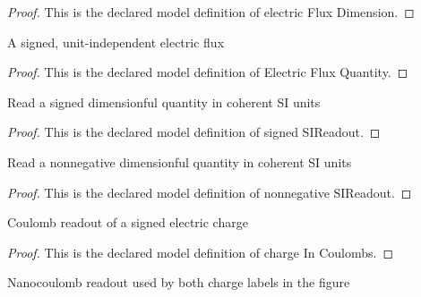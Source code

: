 \begin{proof}
  This is the declared model definition of electric Flux Dimension.
\end{proof}
\begin{definition}
  \label{def:physics:phyx-mini-0847:phyxminiproblems-problemphyxmini0847-electricfluxquantity}
  A signed, unit-independent electric flux
\end{definition}
\begin{proof}
  This is the declared model definition of Electric Flux Quantity.
\end{proof}
\begin{definition}
  \label{def:physics:phyx-mini-0847:phyxminiproblems-problemphyxmini0847-signedsireadout}
  Read a signed dimensionful quantity in coherent SI units
\end{definition}
\begin{proof}
  This is the declared model definition of signed SIReadout.
\end{proof}
\begin{definition}
  \label{def:physics:phyx-mini-0847:phyxminiproblems-problemphyxmini0847-nonnegativesireadout}
  Read a nonnegative dimensionful quantity in coherent SI units
\end{definition}
\begin{proof}
  This is the declared model definition of nonnegative SIReadout.
\end{proof}
\begin{definition}
  \label{def:physics:phyx-mini-0847:phyxminiproblems-problemphyxmini0847-chargeincoulombs}
  Coulomb readout of a signed electric charge
\end{definition}
\begin{proof}
  This is the declared model definition of charge In Coulombs.
\end{proof}
\begin{definition}
  \label{def:physics:phyx-mini-0847:phyxminiproblems-problemphyxmini0847-chargeinnanocoulombs}
  Nanocoulomb readout used by both charge labels in the figure
\end{definition}
